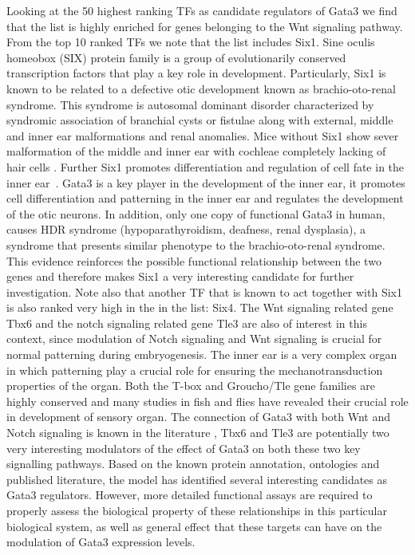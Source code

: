 \documentclass{article}
\begin{document}

Looking at the 50 highest ranking TFs as candidate regulators of Gata3
we find  that the list is  highly enriched for genes  belonging to the
Wnt signaling  pathway.  From the top  10 ranked TFs we  note that the
list includes  Six1. Sine  oculis homeobox (SIX)  protein family  is a
group of  evolutionarily conserved  transcription factors that  play a
key role in development. Particularly,  Six1 is known to be related to
a  defective  otic development  known  as brachio-oto-renal  syndrome.
This  syndrome   is  autosomal  dominant   disorder  characterized  by
syndromic  association  of  branchial  cysts or  fistulae  along  with
external, middle and inner ear malformations and renal anomalies. Mice
without Six1 show sever malformation  of the middle and inner ear with
cochleae completely  lacking of hair  cells \cite{Bosman2009}. Further
Six1 promotes differentiation and regulation of cell fate in the inner
ear~\cite{Fritzsch2007,Bosman2009}.  Gata3  is  a  key player  in  the
development  of the inner  ear, it  promotes cell  differentiation and
patterning in the inner ear  and regulates the development of the otic
neurons.  In addition,  only one  copy of  functional Gata3  in human,
causes HDR syndrome (hypoparathyroidism, deafness, renal dysplasia), a
syndrome  that  presents similar  phenotype  to the  brachio-oto-renal
syndrome.   This   evidence   reinforces   the   possible   functional
relationship between  the two  genes and therefore  makes Six1  a very
interesting  candidate  for  further  investigation.  Note  also  that
another TF that is known to act together with Six1 is also ranked very
high in the in the list: Six4. The Wnt signaling related gene Tbx6 and
the notch  signaling related  gene Tle3 are  also of interest  in this
context,  since modulation  of Notch  signaling and  Wnt  signaling is
crucial for normal patterning during embryogenesis. The inner ear is a
very  complex  organ in  which  patterning  play  a crucial  role  for
ensuring  the mechanotransduction  properties of  the organ.  Both the
T-box  and Groucho/Tle  gene families  are highly  conserved  and many
studies  in  fish  and  flies  have revealed  their  crucial  role  in
development of  sensory organ. The  connection of Gata3 with  both Wnt
and     Notch    signaling    is     known    in     the    literature
\cite{Rivolta2002,Kelly2009}, Tbx6  and Tle3 are  potentially two very
interesting modulators  of the effect of  Gata3 on both  these two key
signalling pathways. Based on the known protein annotation, ontologies
and published literature, the model has identified several interesting
candidates  as  Gata3 regulators.  However,  more detailed  functional
assays  are required  to properly  assess the  biological  property of
these relationships  in this particular biological system,  as well as
general effect that these targets  can have on the modulation of Gata3
expression levels.
\end{document}
